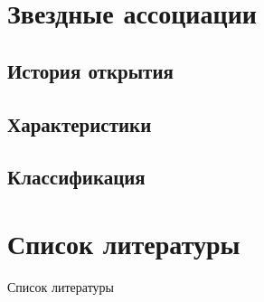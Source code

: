 \documentclass{beamer}
\begin{document}
    \section{Звездные ассоциации}
    
    \subsection{История открытия}
    
    \subsection{Характеристики}
    
    \subsection{Классификация}


    \section{Список литературы}
    \begin{frame}[t, allowframebreaks]{Список литературы}
        
        
    \end{frame}
\end{document}
